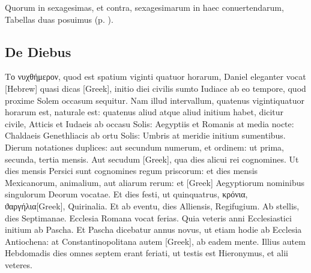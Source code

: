 Quorum in sexagesimas, et
contra, sexagesimarum in haec conuertendarum, Tabellas duas posuimus
 (p. \pageref{tab:convertendi_ostenta}).


\subsection{De Diebus}

\textgreek{Το νυχθήμερον},
quod est spatium viginti quatuor horarum, Daniel
eleganter vocat \texthebrew{[Hebrew]} quasi dicas
\textgreek{[Greek]}, initio diei civilis
sumto Iudiace ab eo tempore, quod proxime Solem occasum
sequitur.
Nam illud intervallum, quatenus vigintiquatuor horarum est,
naturale est: quatenus aliud atque aliud initium habet, dicitur civile,
Atticis et Iudaeis ab occasu Solis: Aegyptiis et Romanis at media nocte:
Chaldaeis Genethliacis ab ortu Solis: Umbris at meridie initium
sumentibus.
Dierum notationes duplices: aut secundum numerum, et
ordinem: ut prima, secunda, tertia mensis.
Aut secudum \textgreek{[Greek]},
qua dies alicui rei cognomines.
Ut dies mensis Persici sunt cognomines
regum priscorum: et dies mensis Mexicanorum, animalium, aut aliarum
rerum: et \textgreek{[Greek]} Aegyptiorum nominibus singulorum Deorum
vocatae.
Et dies festi, ut quinquatrus, \textgreek{κρόνια},
\textgreek{ϑαργήλια[Greek]}, Quirinalia.
Et ab eventu, dies Alliensis, Regifugium.
Ab stellis, dies Septimanae.
Ecclesia Romana vocat ferias.
Quia veteris anni Ecclesiastici initium
ab Pascha.
Et Pascha dicebatur annus novus, ut etiam hodie ab Ecclesia
Antiochena: at Constantinopolitana autem \textgreek{[Greek]},
ab eadem mente.
Illius autem Hebdomadis dies omnes septem erant
feriati, ut testis est Hieronymus, et alii veteres.
